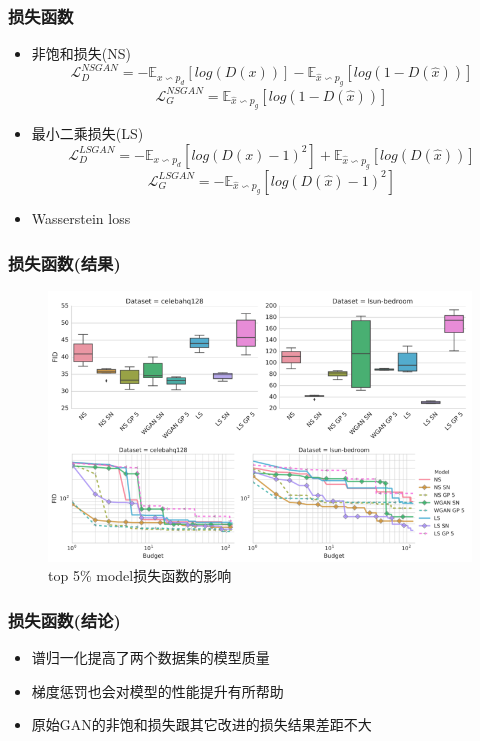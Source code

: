 \documentclass{beamer}
\begin{document}
\begin{frame}[c]\frametitle{损失函数}
    \begin{itemize}
        \item 非饱和损失(NS)
$$\mathcal{L}_D^{NSGAN} = -\mathbb{E}_{x\backsim p_d}[log(D(x))] - \mathbb{E}_{\hat{x}\backsim p_g}[log(1 - D(\hat{x}))] $$
$$\mathcal{L}_G^{NSGAN} = \mathbb{E}_{\hat{x}\backsim p_g}[log(1 - D(\hat{x}))]$$
        \item 最小二乘损失(LS) 
$$\mathcal{L}_D^{LSGAN} = -\mathbb{E}_{x\backsim p_d}[log(D(x) - 1)^2] + \mathbb{E}_{\hat{x}\backsim p_g}[log(D(\hat{x}))]$$
$$\mathcal{L}_G^{LSGAN} = -\mathbb{E}_{\hat{x}\backsim p_g}[log(D(\hat{x}) - 1)^2]$$
        \item Wasserstein loss
       
    \end{itemize}
\end{frame}

\begin{frame}[c]\frametitle{损失函数(结果)}
    \begin{figure}[top]
        \centering
        \includegraphics[scale=0.5]{lossResult.png}
        \caption{top 5\% model损失函数的影响}
    \end{figure}
\end{frame}

\begin{frame}[c]\frametitle{损失函数(结论)}
    \begin{itemize}
        \item 谱归一化提高了两个数据集的模型质量
        \item 梯度惩罚也会对模型的性能提升有所帮助
        \item 原始GAN的非饱和损失跟其它改进的损失结果差距不大
    \end{itemize}
\end{frame}
\end{document}
